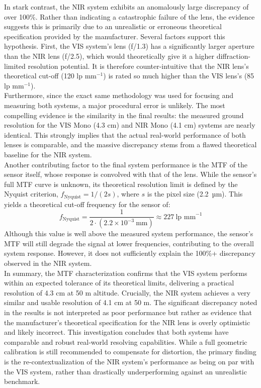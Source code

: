 \noindent In stark contrast, the NIR system exhibits an anomalously large discrepancy of over 100\%. Rather than indicating a catastrophic failure of the lens, the evidence suggests this is primarily due to an unrealistic or erroneous theoretical specification provided by the manufacturer. Several factors support this hypothesis. First, the VIS system's lens (f/1.3) has a significantly larger aperture than the NIR lens (f/2.5), which would theoretically give it a higher diffraction-limited resolution potential. It is therefore counter-intuitive that the NIR lens's theoretical cut-off (120 lp mm$^{-1}$) is rated so much higher than the VIS lens's (85 lp mm$^{-1}$).\\

\noindent Furthermore, since the exact same methodology was used for focusing and measuring both systems, a major procedural error is unlikely. The most compelling evidence is the similarity in the final results: the measured ground resolution for the VIS Mono (4.3 cm) and NIR Mono (4.1 cm) systems are nearly identical. This strongly implies that the actual real-world performance of both lenses is comparable, and the massive discrepancy stems from a flawed theoretical baseline for the NIR system.\\

\noindent Another contributing factor to the final system performance is the MTF of the sensor itself, whose response is convolved with that of the lens. While the sensor's full MTF curve is unknown, its theoretical resolution limit is defined by the Nyquist criterion, $f_{\text{Nyquist}} = 1/(2s)$, where $s$ is the pixel size (2.2~µm). This yields a theoretical cut-off frequency for the sensor of:
\[ f_{\text{Nyquist}} = \frac{1}{2 \cdot (2.2 \times 10^{-3}~\text{mm})} \approx 227~\text{lp mm}^{-1} \]
Although this value is well above the measured system performance, the sensor's MTF will still degrade the signal at lower frequencies, contributing to the overall system response. However, it does not sufficiently explain the 100\%+ discrepancy observed in the NIR system.\\

\noindent 
In summary, the MTF characterization confirms that the VIS system performs within an expected tolerance of its theoretical limits, delivering a practical resolution of 4.3 cm at 50 m altitude. Crucially, the NIR system achieves a very similar and usable resolution of 4.1 cm at 50 m. The significant discrepancy noted in the results is not interpreted as poor performance but rather as evidence that the manufacturer's theoretical specification for the NIR lens is overly optimistic and likely incorrect. This investigation concludes that both systems have comparable and robust real-world resolving capabilities. While a full geometric calibration is still recommended to compensate for distortion, the primary finding is the re-contextualization of the NIR system's performance as being on par with the VIS system, rather than drastically underperforming against an unrealistic benchmark.\\

